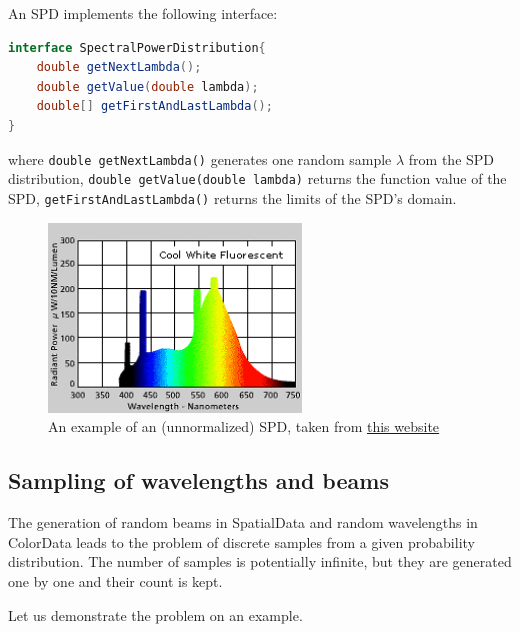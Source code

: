 \documentclass[12pt, letterpaper]{article}
\begin{document}
An SPD implements the following interface:
\begin{lstlisting}[language=Java]
interface SpectralPowerDistribution{
	double getNextLambda();
	double getValue(double lambda);
	double[] getFirstAndLastLambda();
}
\end{lstlisting}
where \verb|double getNextLambda()| generates one random sample $\lambda$ from the SPD distribution, \verb|double getValue(double lambda)| returns the function value of the SPD, \verb|getFirstAndLastLambda()| returns the limits of the SPD's  domain.

\begin{figure}[H]%
\centering 
\includegraphics[width=0.6\textwidth]{Spd.png}
\caption{An example of  an (unnormalized) SPD, taken from \href{http://www.lrc.rpi.edu/education/learning/terminology/spectralpowerdistribution.asp}{this website}}
\end{figure}

\subsection{Sampling of wavelengths and beams}

The generation of random beams in SpatialData and random wavelengths in ColorData leads to the problem of discrete samples from a given probability distribution. The number of samples is potentially infinite, but they are generated one by one and their count is kept.

Let us demonstrate the problem on an example.
\end{document}
